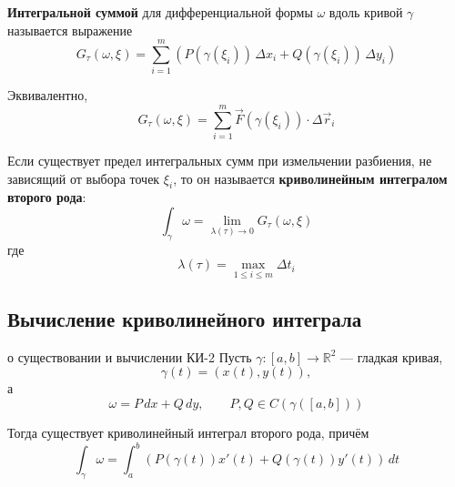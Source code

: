 \documentclass[12pt,a4paper]{article}
\begin{document}
\begin{definition}
\textbf{Интегральной суммой} для дифференциальной формы $\omega$ вдоль кривой $\gamma$ называется выражение
\[
G_\tau(\omega,\xi)
=
\sum_{i=1}^{m}
\left(
P(\gamma(\xi_i))\,\Delta x_i
+
Q(\gamma(\xi_i))\,\Delta y_i
\right)
\]

Эквивалентно,
\[
G_\tau(\omega,\xi)
=
\sum_{i=1}^{m}
\vec{F}(\gamma(\xi_i))\cdot\Delta\vec{r}_i
\]

Если существует предел интегральных сумм при измельчении разбиения, не зависящий от выбора точек $\xi_i$, то он называется \textbf{криволинейным интегралом второго рода}:
\[
\int_\gamma\omega
=
\lim_{\lambda(\tau)\to0}
G_\tau(\omega,\xi)
\]
где
\[
\lambda(\tau)=\max_{1\le i\le m}\Delta t_i
\]
\end{definition}

\subsection{Вычисление криволинейного интеграла}

\begin{theorem}{о существовании и вычислении КИ-2}
Пусть $\gamma\colon[a,b]\to\mathbb{R}^2$ — гладкая кривая,
\[
\gamma(t)=(x(t),y(t)),
\]
а
\[
\omega=P\,dx+Q\,dy,
\qquad P,Q\in C(\gamma([a,b]))
\]

Тогда существует криволинейный интеграл второго рода, причём
\[
\int_\gamma\omega
=
\int_a^b
\left(
P(\gamma(t))x'(t)
+
Q(\gamma(t))y'(t)
\right)\,dt
\]
\end{theorem}
\end{document}
